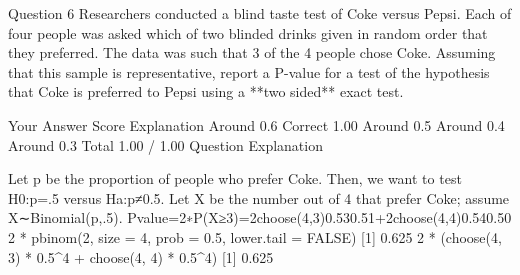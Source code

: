 
Question 6
Researchers conducted a blind taste test of Coke versus Pepsi. Each of four people was asked which of two blinded drinks given in random order that they preferred. The data was such that 3 of the 4 people chose Coke. Assuming that this sample is representative, report a P-value for a test of the hypothesis that Coke is preferred to Pepsi using a **two sided** exact test.

Your Answer		Score	Explanation
Around 0.6	Correct	1.00	
Around 0.5			
Around 0.4			
Around 0.3			
Total		1.00 / 1.00	
Question Explanation

Let p be the proportion of people who prefer Coke. Then, we want to test H0:p=.5 versus Ha:p≠0.5. Let X be the number out of 4 that prefer Coke; assume X∼Binomial(p,.5). Pvalue=2∗P(X≥3)=2choose(4,3)0.530.51+2choose(4,4)0.540.50
2 * pbinom(2, size = 4, prob = 0.5, lower.tail = FALSE)
[1] 0.625
2 * (choose(4, 3) * 0.5^4 + choose(4, 4) * 0.5^4)
[1] 0.625
